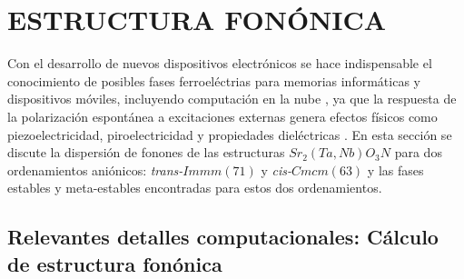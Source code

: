 
\section{ESTRUCTURA FONÓNICA}

Con el desarrollo de nuevos dispositivos electrónicos se hace indispensable el conocimiento de posibles fases ferroeléctrias para memorias informáticas y dispositivos móviles, incluyendo computación en la nube \cite{Scott2007Ferroelectrics}, ya que la respuesta de la polarización espontánea a excitaciones externas genera efectos físicos como piezoelectricidad, piroelectricidad y propiedades dieléctricas \cite{Shi2016SymmetryFerroelectrics}. En esta sección se discute la dispersión de fonones de las estructuras $Sr_{2}(Ta,Nb)O_{3}N$ para dos ordenamientos aniónicos: \emph{trans-}$Immm(71)$ y \emph{cis-}$Cmcm(63)$ y las fases estables y meta-estables encontradas para estos dos ordenamientos.

\subsection{Relevantes detalles computacionales: Cálculo de estructura fonónica}

